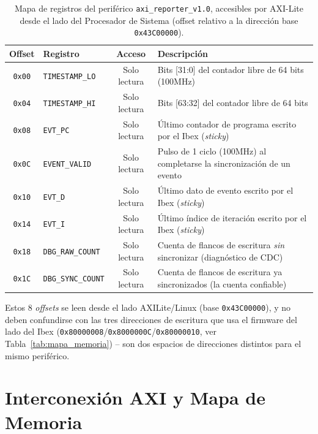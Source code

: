 \begin{table}[htbp]
\centering
\caption{Mapa de registros del periférico \texttt{axi\_reporter\_v1.0}, accesibles por AXI-Lite desde el lado del Procesador de Sistema (offset relativo a la dirección base \texttt{0x43C00000}).}
\label{tab:mapa_registros_reporter}
\begin{tabular}{clcl}
\hline
\textbf{Offset} & \textbf{Registro} & \textbf{Acceso} & \textbf{Descripción} \\ \hline
\texttt{0x00} & \texttt{TIMESTAMP\_LO}   & Solo lectura & Bits [31:0] del contador libre de 64 bits (100MHz) \\
\texttt{0x04} & \texttt{TIMESTAMP\_HI}   & Solo lectura & Bits [63:32] del contador libre de 64 bits \\
\texttt{0x08} & \texttt{EVT\_PC}         & Solo lectura & Último contador de programa escrito por el Ibex (\textit{sticky}) \\
\texttt{0x0C} & \texttt{EVENT\_VALID}    & Solo lectura & Pulso de 1 ciclo (100MHz) al completarse la sincronización de un evento \\
\texttt{0x10} & \texttt{EVT\_D}          & Solo lectura & Último dato de evento escrito por el Ibex (\textit{sticky}) \\
\texttt{0x14} & \texttt{EVT\_I}          & Solo lectura & Último índice de iteración escrito por el Ibex (\textit{sticky}) \\
\texttt{0x18} & \texttt{DBG\_RAW\_COUNT} & Solo lectura & Cuenta de flancos de escritura \emph{sin} sincronizar (diagnóstico de CDC) \\
\texttt{0x1C} & \texttt{DBG\_SYNC\_COUNT}& Solo lectura & Cuenta de flancos de escritura ya sincronizados (la cuenta confiable) \\ \hline
\end{tabular}
\end{table}

Estos 8 \textit{offsets} se leen desde el lado AXI\-Lite/Linux (base
    \texttt{0x43C00000}), y no deben confundirse con las tres direcciones
    de escritura que usa el firmware del lado del Ibex
    (\texttt{0x80000008}/\texttt{0x8000000C}/\texttt{0x80000010}, ver
    Tabla~\ref{tab:mapa_memoria}) -- son dos espacios de direcciones
    distintos para el mismo periférico.

\section{Interconexión AXI y Mapa de Memoria}
\label{sec:interconexion_axi}

